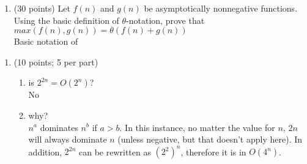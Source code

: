 \documentclass{article}
\begin{document}
    \begin{enumerate}[label=\textbf{Q3}]
        \item (30 points) Let $f(n)$ and $g(n)$ be asymptotically nonnegative functions. Using the basic
        definition of $\theta$-notation, prove that $max(f(n),g(n))= \theta(f(n)+g(n))$\\[0.25in]
        Basic notation of
    \end{enumerate}

    \begin{enumerate}[label=\textbf{Q4}]
        \item (10 points; 5 per part)
        \begin{enumerate}[label=(\alph*)]
            \item is $2^{2n} = O(2^n)$?\\
            No
            \item why?\\
            $n^a$ dominates $n^b$ if $a > b$. In this instance, no matter the value for $n$, $2n$ will always
            dominate $n$ (unless negative, but that doesn't apply here). In addition, $2^{2n}$ can be rewritten 
            as $(2^2)^n$, therefore it is in $O(4^n)$.
        \end{enumerate}
    \end{enumerate}
\end{document}
